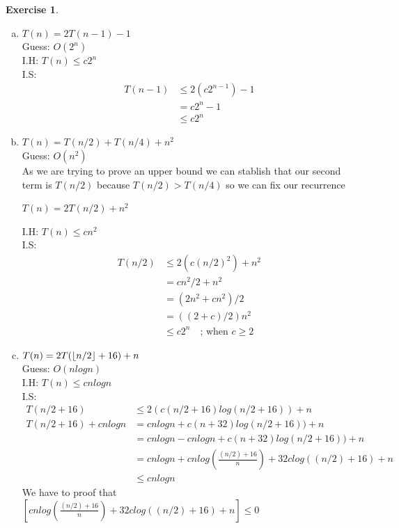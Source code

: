 \documentclass{article}
\DeclarePairedDelimiter\floor{\lfloor}{\rfloor}
\theoremstyle{definition}
\newtheorem{exercise}{Exercise}[section]
\begin{document}
\begin{exercise}
\begin{enumerate}[a)]
        \item $T(n) = 2T(n-1) - 1$\\
        Guess: $O(2^n)$\\
        I.H: $T(n) \leqslant \textit{c}2^n$\\
        I.S: 
        \begin{align*}
            T(n-1) &\leqslant 2(c 2^{n-1})-1\\
            &=  c2^n-1\\
            &\leqslant c2^n                 
        \end{align*}
        \item $T(n) = T(n/2) + T(n/4) + n^2$\\
        Guess: $O(n^2)$\\
        As we are trying to prove an upper bound we can stablish that our second term is $T(n/2)$ because $T(n/2)>T(n/4)$ so we can fix our recurrence 
        \begin{center}
            $T(n)=2T(n/2)+n^2$
        \end{center}
        I.H: $T(n) \leqslant \textit{c}n^2$\\
        I.S: 
        \begin{align*}
            T(n/2) &\leqslant 2(c(n/2)^2)+n^2\\
            &=  cn^2/2 + n^2\\
            &=  (2n^2+cn^2)/2\\
            &= ((2+c)/2)n^2\\
            &\leqslant c2^n  \quad\text{;  when $c\geqslant2$}               
        \end{align*}
        \item $T(n) = 2T(\floor*{n/2} + 16) + n$\\
        Guess: $O(nlogn)$\\
        I.H: $T(n) \leqslant \textit{c}nlogn$\\
        I.S: 
        \begin{align*}
            T(n/2+16) &\leqslant 2(c(n/2+16)log(n/2+16))+n\\
            T(n/2+16)+cnlogn&=cnlogn+c(n+32)log(n/2+16))+n\\
            &=cnlogn - cnlogn+c(n+32)log(n/2+16))+n \\
            &=cnlogn + cnlog(\frac{(n/2)+16}{n})+32clog((n/2)+16)+n\\
            &\leqslant cnlogn
        \end{align*}
        We have to proof that $[cnlog(\frac{(n/2)+16}{n})+32clog((n/2)+16)+n] \leqslant  0$\\

\end{enumerate}
\end{exercise}
\end{document}

